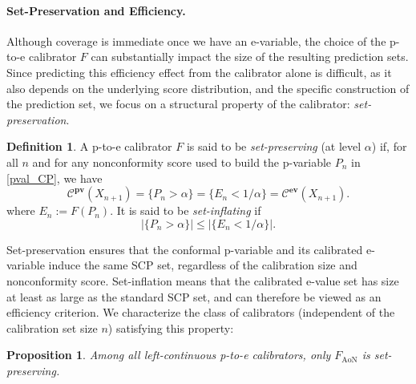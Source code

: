 \documentclass{article}
\theoremstyle{plain}
\newtheorem{proposition}[theorem]{Proposition}
\theoremstyle{definition}
\newtheorem{definition}[theorem]{Definition}
\theoremstyle{remark}
\begin{document}


\paragraph{Set-Preservation and Efficiency.} Although coverage is immediate once we have an e-variable, the choice of the p-to-e calibrator $F$ can substantially impact the size of the resulting prediction sets. Since predicting this efficiency effect from the calibrator alone is difficult, as it also depends on the underlying score distribution, and the specific construction of the prediction set,  we focus on a structural property of the calibrator: \emph{set-preservation}. %



\begin{definition}

A p-to-e calibrator $F$ is said to be \emph{set-preserving} (at level $\alpha$) if, for all $n$ and for any nonconformity score used to build the p-variable $P_n$ in \eqref{pval_CP}, we have
\[
\mathcal{C}^{\textbf{pv}}(X_{n+1})
    = \{ P_n > \alpha \}
    = \{ E_{n} < 1/\alpha \}
    = \mathcal{C}^{\textbf{ev}}(X_{n+1}).
\]
where  $E_n:=F(P_n)$. It is said to be \textit{set-inflating} if  $$|\{ P_n > \alpha \}|\le 
|\{ E_{n} < 1/\alpha \}|.$$
\end{definition}

Set-preservation ensures that the conformal p-variable and its calibrated e-variable induce  the same SCP set, regardless of the calibration size and nonconformity score. Set-inflation means that the calibrated e-value set has size at least
as large as the standard SCP set, and can therefore be viewed as an
efficiency criterion. We characterize the class of calibrators (independent of the calibration set size $n$) satisfying this property:

\begin{proposition}\label{prop:only_aon_set_preserving}
Among all left-continuous p-to-e calibrators, only $F_{\mathrm{AoN}}$ is set-preserving.

\end{proposition}
\end{document}
